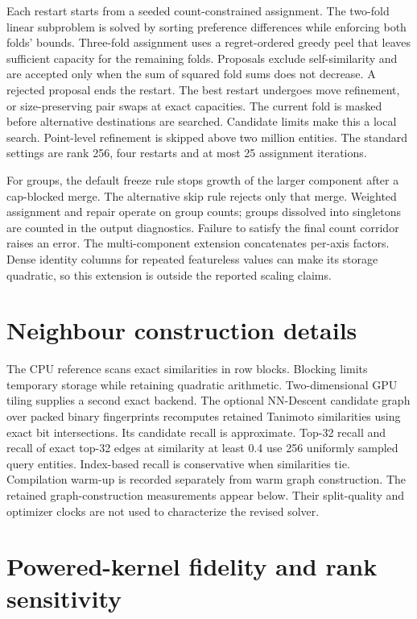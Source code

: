 Each restart starts from a seeded count-constrained assignment. The two-fold
linear subproblem is solved by sorting preference differences while enforcing
both folds' bounds. Three-fold assignment uses a regret-ordered greedy peel
that leaves sufficient capacity for the remaining folds. Proposals exclude
self-similarity and are accepted only when the sum of squared fold sums does
not decrease. A rejected proposal ends the restart. The best restart undergoes
move refinement, or size-preserving pair swaps at exact capacities. The current
fold is masked before alternative destinations are searched. Candidate limits
make this a local search. Point-level refinement is skipped above two million
entities. The standard settings are rank 256, four restarts and at most 25
assignment iterations.

For groups, the default freeze rule stops growth of the larger component after
a cap-blocked merge. The alternative skip rule rejects only that merge. Weighted
assignment and repair operate on group counts; groups dissolved into singletons
are counted in the output diagnostics. Failure to satisfy the final count
corridor raises an error. The multi-component extension concatenates per-axis
factors. Dense identity columns for repeated featureless values can make its
storage quadratic, so this extension is outside the reported scaling claims.

\section{Neighbour construction details}

The CPU reference scans exact similarities in row blocks. Blocking limits
temporary storage while retaining quadratic arithmetic. Two-dimensional GPU
tiling supplies a second exact backend. The optional NN-Descent candidate graph
over packed binary fingerprints recomputes retained Tanimoto similarities using
exact bit intersections. Its candidate recall is approximate. Top-32 recall and
recall of exact top-32 edges at similarity at least 0.4 use 256 uniformly sampled
query entities. Index-based recall is conservative when similarities tie.
Compilation warm-up is recorded separately from warm graph construction.
The retained graph-construction measurements appear below. Their split-quality
and optimizer clocks are not used to characterize the revised solver.


\section{Powered-kernel fidelity and rank sensitivity}

